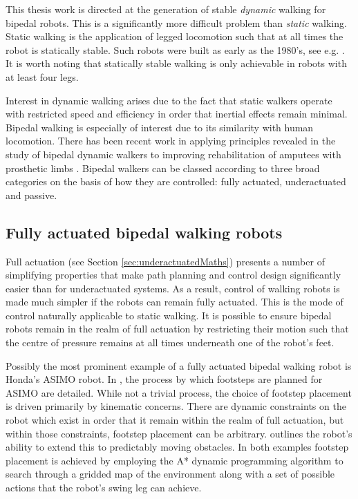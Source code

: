 This thesis work is directed at the generation of stable \textit{dynamic} walking for bipedal robots. This is a significantly more difficult problem than \textit{static} walking. Static walking is the application of legged locomotion such that at all times the robot is statically stable. Such robots were built as early as the 1980's, see e.g. \cite{russell1983odex, waldron1986adaptive}. It is worth noting that statically stable walking is only achievable in robots with at least four legs.

Interest in dynamic walking arises due to the fact that static walkers operate with restricted speed and efficiency in order that inertial effects remain minimal. Bipedal walking is especially of interest due to its similarity with human locomotion. There has been recent work in applying principles revealed in the study of bipedal dynamic walkers to improving rehabilitation of amputees with prosthetic limbs \cite{martinpredicting}. Bipedal walkers can be classed according to three broad categories on the basis of how they are controlled: fully actuated, underactuated and passive.

\subsection{Fully actuated bipedal walking robots}
Full actuation (see Section \ref{sec:underactuatedMaths}) presents a number of simplifying properties that make path planning and control design significantly easier than for underactuated systems. As a result, control of walking robots is made much simpler if the robots can remain fully actuated. This is the mode of control naturally applicable to static walking. It is possible to ensure bipedal robots remain in the realm of full actuation by restricting their motion such that the centre of pressure remains at all times underneath one of the robot's feet.

Possibly the most prominent example of a fully actuated bipedal walking robot is Honda's ASIMO robot. In \cite{chestnutt2005footstep}, the process by which footsteps are planned for ASIMO are detailed. While not a trivial process, the choice of footstep placement is driven primarily by kinematic concerns. There are dynamic constraints on the robot which exist in order that it remain within the realm of full actuation, but within those constraints, footstep placement can be arbitrary. \cite{chestnutt2007locomotion} outlines the robot's ability to extend this to predictably moving obstacles. In both examples footstep placement is achieved by employing the A* dynamic programming algorithm to search through a gridded map of the environment along with a set of possible actions that the robot's swing leg can achieve.

